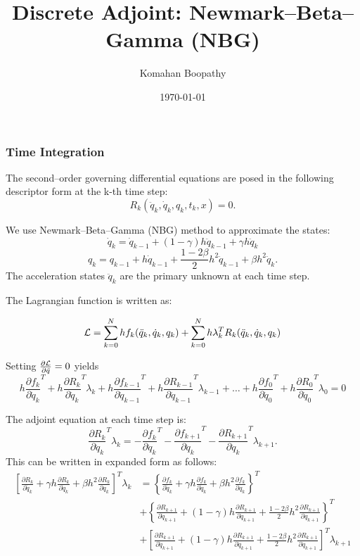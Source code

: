 \documentclass{beamer}
\title[\hspace{-0.2cm} DIRK Adjoint]
{
Discrete Adjoint: Newmark--Beta--Gamma (NBG)
}
\author[Komahan Boopathy]
{
  \Large {Komahan Boopathy}\\
}
\institute
{
  \large Georgia Institute of Technology\\
 School of Aerospace Engineering\\
 Atlanta, GA
}
\date
{
\small \today
}
\newcommand{\pd}[2]{\frac{\partial #1}{\partial #2}}
\begin{document}
\begin{frame}
  \titlepage
\end{frame}


\begin{frame}[allowframebreaks] \frametitle{Time Integration}

  The second--order governing differential equations are posed in the following
  descriptor form at the k-th time step:
  $$ R_k(\ddot{q}_k, \dot{q}_k, q_k, t_k , x) = 0.$$

  We use Newmark--Beta--Gamma (NBG) method to approximate the states:
  $$ \dot{q}_k  = \dot{q}_{k-1}  + (1-\gamma) h \ddot{q}_{k-1} +  \gamma h \ddot{q}_{k}$$ 
  $$ {q}_k      =     {q}_{k-1}  + h \dot{q}_{k-1} +\frac{1-2\beta}{2} h^2\ddot{q}_{k-1}+ \beta h^2 \ddot{q}_k.$$
  The acceleration states $\ddot{q}_k$ are the primary unknown at each time step.
  
  \framebreak

  The Lagrangian function is written as:

  $${\cal{L}} = \sum_{k=0}^N h f_k(\ddot{q}_k, \dot{q}_k, q_k) + \sum_{k=0}^N h  \lambda_k^T R_k(\ddot{q}_k, \dot{q}_k, q_k) $$

  Setting $\pd{\cal{L}}{\ddot{q}} = 0$ yields
  \small{
  $$ h\pd{f_k}{\ddot{q}_k}^T + h \pd{R_k}{\ddot{q}_k}^T \lambda_k
  + h\pd{f_{k-1}}{\ddot{q}_{k-1}}^T +  h \pd{R_{k-1}}{\ddot{q}_{k-1}}^T \lambda_{k-1} + \ldots + 
  h\pd{f_0}{\ddot{q}_0}^T + h \pd{R_0}{\ddot{q}_0}^T \lambda_0
  = 0 $$
  }

  The adjoint equation at each time step is:
  $$\pd{R_k}{\ddot{q}_k}^T \lambda_k = - \pd{f_k}{\ddot{q}_k}^T  - \pd{f_{k+1}}{\ddot{q}_{k}}^T - \pd{R_{k+1}}{\ddot{q}_{k}}^T \lambda_{k+1}.$$
  This can be written in expanded form as follows:
  \scriptsize{
  \begin{equation}\nonumber\begin{split}
    \left[ \pd{R_k}{\ddot{q}_k} + \gamma h \pd{R_k}{\dot{q}_k} + \beta h^2 \pd{R_k}{{q}_k} \right]^T \lambda_k & = \left\{ \pd{f_k}{\ddot{q}_k} + \gamma h \pd{f_k}{\dot{q}_k} + \beta h^2 \pd{f_k}{{q}_k} \right\}^T \\ & +  \left\{ \pd{R_{k+1}}{\ddot{q}_{k+1}} + (1-\gamma) h \pd{R_{k+1}}{\dot{q}_{k+1}} + \frac{1-2\beta}{2} h^2 \pd{R_{k+1}}{{q}_{k+1}} \right\}^T \\
    & +  \left[ \pd{R_{k+1}}{\ddot{q}_{k+1}} + (1-\gamma) h \pd{R_{k+1}}{\dot{q}_{k+1}} + \frac{1-2\beta}{2} h^2 \pd{R_{k+1}}{{q}_{k+1}} \right]^T\lambda_{k+1} \\
      \end{split}
  \end{equation}
  }
  
\end{frame}
\end{document}
